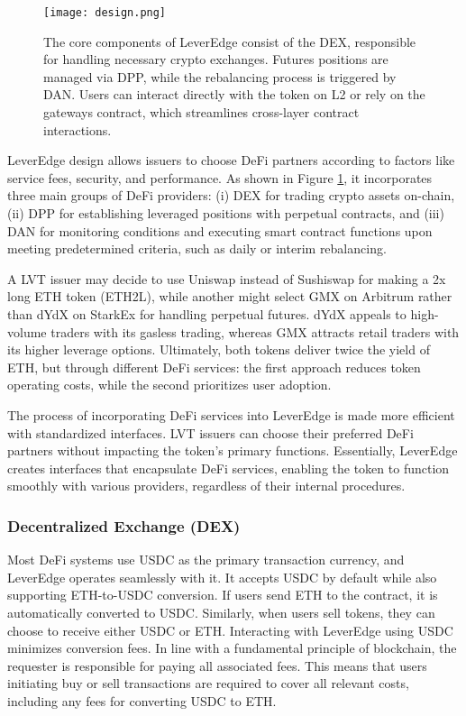 \begin{figure}[t]
	\centering
	\texttt{[image: design.png]}
	\caption{The core components of LeverEdge consist of the DEX, responsible for handling necessary crypto exchanges. Futures positions are managed via DPP, while the rebalancing process is triggered by DAN. Users can interact directly with the token on L2 or rely on the gateways contract, which streamlines cross-layer contract interactions.}
	\label{fig:design}
\end{figure}

LeverEdge design allows issuers to choose DeFi partners according to factors like service fees, security, and performance. As shown in Figure \ref{fig:design}, it incorporates three main groups of DeFi providers: (i) DEX for trading crypto assets on-chain, (ii) DPP for establishing leveraged positions with perpetual contracts, and (iii) DAN for monitoring conditions and executing smart contract functions upon meeting predetermined criteria, such as daily or interim rebalancing.

\begin{example}
	A LVT issuer may decide to use Uniswap instead of Sushiswap for making a 2x long ETH token (ETH2L), while another might select GMX on Arbitrum rather than dYdX on StarkEx for handling perpetual futures. dYdX appeals to high-volume traders with its gasless trading, whereas GMX attracts retail traders with its higher leverage options. Ultimately, both tokens deliver twice the yield of ETH, but through different DeFi services: the first approach reduces token operating costs, while the second prioritizes user adoption.
\end{example}

The process of incorporating DeFi services into LeverEdge is made more efficient with standardized interfaces. LVT issuers can choose their preferred DeFi partners without impacting the token's primary functions. Essentially, LeverEdge creates interfaces that encapsulate DeFi services, enabling the token to function smoothly with various providers, regardless of their internal procedures.

\subsubsection{Decentralized Exchange (DEX)}
Most DeFi systems use USDC as the primary transaction currency, and LeverEdge operates seamlessly with it. It accepts USDC by default while also supporting ETH-to-USDC conversion. If users send ETH to the contract, it is automatically converted to USDC. Similarly, when users sell tokens, they can choose to receive either USDC or ETH. Interacting with LeverEdge using USDC minimizes conversion fees. In line with a fundamental principle of blockchain, the requester is responsible for paying all associated fees. This means that users initiating buy or sell transactions are required to cover all relevant costs, including any fees for converting USDC to ETH.

